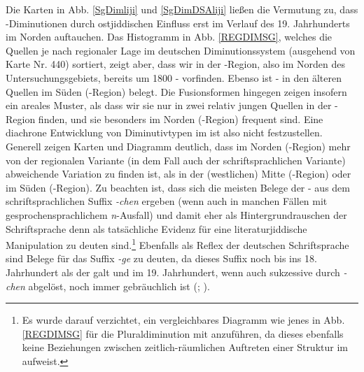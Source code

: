 Die Karten in Abb. \ref{SgDimliji} und \ref{SgDimDSAliji} ließen die Vermutung zu, dass -Diminutionen durch ostjiddischen Einfluss erst im Verlauf des 19. Jahrhunderts im Norden auftauchen. Das Histogramm in Abb. \ref{REGDIMSG}, welches die Quellen je nach regionaler Lage im deutschen Diminutionssystem (ausgehend von  Karte Nr. 440) sortiert, zeigt aber, dass wir in der -Region, also im Norden des Untersuchungsgebiets, bereits um 1800 - vorfinden. Ebenso ist - in den älteren Quellen im Süden (-Region) belegt.\label{LKinberlin} Die Fusionsformen  hingegen zeigen insofern ein areales Muster, als dass wir sie nur in zwei relativ jungen Quellen in der -Region finden, und sie besonders im Norden (-Region) frequent sind. Eine diachrone Entwicklung von Diminutivtypen im  ist also nicht festzustellen. Generell zeigen Karten und Diagramm deutlich, dass im Norden (-Region) mehr von der regionalen Variante (in dem Fall auch der schriftsprachlichen Variante) abweichende Variation zu finden ist, als in der (westlichen) Mitte (-Region) oder im Süden (-Region). Zu beachten ist, dass sich die meisten Belege der - aus dem schriftsprachlichen Suffix \textit{-chen} ergeben (wenn auch in manchen Fällen mit gesprochensprachlichem \textit{n}-Ausfall) und damit eher als Hintergrundrauschen der Schriftsprache denn als tatsächliche Evidenz für eine literaturjiddische Manipulation zu deuten sind.\footnote{Es wurde darauf verzichtet, ein vergleichbares Diagramm wie jenes in Abb. \ref{REGDIMSG} für die Pluraldiminution mit anzuführen, da dieses ebenfalls keine Beziehungen zwischen zeitlich-räumlichen Auftreten einer Struktur im  aufweist.}\label{sgDIMimNordenmehr} Ebenfalls als Reflex der deutschen Schriftsprache sind Belege für das Suffix \textit{-ge} zu deuten, da dieses Suffix noch bis ins 18. Jahrhundert als  der  galt und im 19. Jahrhundert, wenn auch sukzessive durch \textit{-chen} abgelöst, noch immer gebräuchlich ist (\cite{Wegera2000b}; \cite[73f]{Elspass2005}).\\


